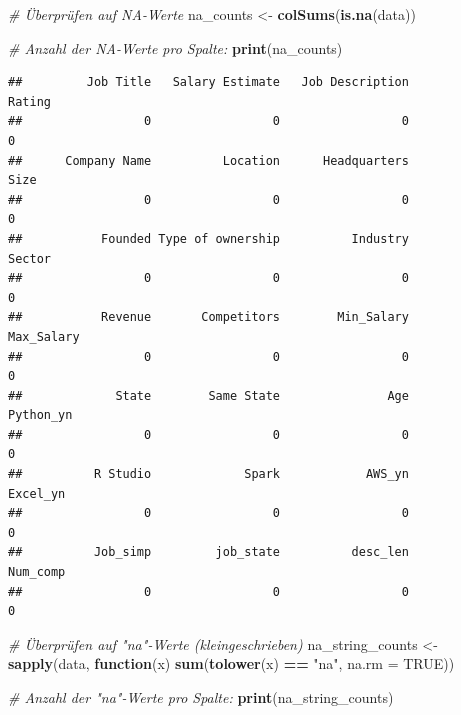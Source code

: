 \documentclass[
]{article}
\newenvironment{Shaded}{\begin{snugshade}}{\end{snugshade}}
\newcommand{\AttributeTok}[1]{\textcolor[rgb]{0.13,0.29,0.53}{#1}}
\newcommand{\CommentTok}[1]{\textcolor[rgb]{0.56,0.35,0.01}{\textit{#1}}}
\newcommand{\ConstantTok}[1]{\textcolor[rgb]{0.56,0.35,0.01}{#1}}
\newcommand{\ControlFlowTok}[1]{\textcolor[rgb]{0.13,0.29,0.53}{\textbf{#1}}}
\newcommand{\FunctionTok}[1]{\textcolor[rgb]{0.13,0.29,0.53}{\textbf{#1}}}
\newcommand{\NormalTok}[1]{#1}
\newcommand{\OtherTok}[1]{\textcolor[rgb]{0.56,0.35,0.01}{#1}}
\newcommand{\SpecialCharTok}[1]{\textcolor[rgb]{0.81,0.36,0.00}{\textbf{#1}}}
\newcommand{\StringTok}[1]{\textcolor[rgb]{0.31,0.60,0.02}{#1}}
\begin{document}
\begin{Shaded}
\begin{Highlighting}[]
\CommentTok{\# Überprüfen auf NA{-}Werte}
\NormalTok{na\_counts }\OtherTok{\textless{}{-}} \FunctionTok{colSums}\NormalTok{(}\FunctionTok{is.na}\NormalTok{(data))}

\CommentTok{\# Anzahl der NA{-}Werte pro Spalte:}
\FunctionTok{print}\NormalTok{(na\_counts)}
\end{Highlighting}
\end{Shaded}

\begin{verbatim}
##         Job Title   Salary Estimate   Job Description            Rating 
##                 0                 0                 0                 0 
##      Company Name          Location      Headquarters              Size 
##                 0                 0                 0                 0 
##           Founded Type of ownership          Industry            Sector 
##                 0                 0                 0                 0 
##           Revenue       Competitors        Min_Salary        Max_Salary 
##                 0                 0                 0                 0 
##             State        Same State               Age         Python_yn 
##                 0                 0                 0                 0 
##          R Studio             Spark            AWS_yn          Excel_yn 
##                 0                 0                 0                 0 
##          Job_simp         job_state          desc_len          Num_comp 
##                 0                 0                 0                 0
\end{verbatim}

\begin{Shaded}
\begin{Highlighting}[]
\CommentTok{\# Überprüfen auf "na"{-}Werte (kleingeschrieben)}
\NormalTok{na\_string\_counts }\OtherTok{\textless{}{-}} \FunctionTok{sapply}\NormalTok{(data, }\ControlFlowTok{function}\NormalTok{(x) }\FunctionTok{sum}\NormalTok{(}\FunctionTok{tolower}\NormalTok{(x) }\SpecialCharTok{==} \StringTok{"na"}\NormalTok{, }\AttributeTok{na.rm =} \ConstantTok{TRUE}\NormalTok{))}

\CommentTok{\# Anzahl der "na"{-}Werte pro Spalte:}
\FunctionTok{print}\NormalTok{(na\_string\_counts)}
\end{Highlighting}
\end{Shaded}
\end{document}
